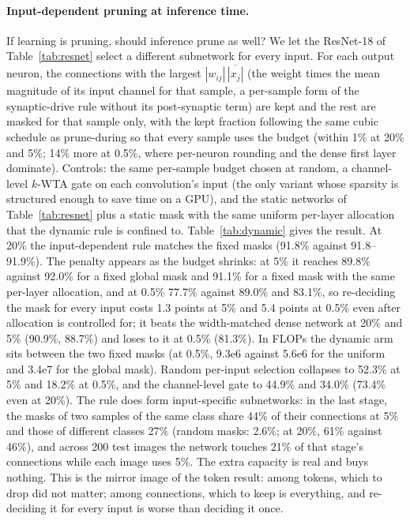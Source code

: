 \documentclass[11pt]{article}
\begin{document}
\paragraph{Input-dependent pruning at inference time.} If learning is pruning, should inference prune as well? We let
the ResNet-18 of Table~\ref{tab:resnet} select a different subnetwork for every input. For each output neuron, the connections
with the largest $|w_{ij}|\,\overline{|x_j|}$ (the weight times the mean magnitude of its input channel for that sample, a
per-sample form of the synaptic-drive rule without its post-synaptic term) are kept and the rest are masked for that sample
only, with the kept fraction following the same cubic schedule as prune-during so that every sample uses the budget (within
1\% at 20\% and 5\%; 14\% more at 0.5\%, where per-neuron rounding and the dense first layer dominate). Controls: the same per-sample
budget chosen at random, a channel-level $k$-WTA gate on each convolution's input (the only variant whose sparsity is structured
enough to save time on a GPU), and the static networks of Table~\ref{tab:resnet} plus a static mask with the same uniform
per-layer allocation that the dynamic rule is confined to. Table~\ref{tab:dynamic} gives the result. At 20\% the input-dependent
rule matches the fixed masks (91.8\% against 91.8--91.9\%). The penalty appears as the budget shrinks: at 5\% it reaches
89.8\% against 92.0\% for a fixed global mask and 91.1\% for a fixed mask with the same per-layer allocation, and at 0.5\%
77.7\% against 89.0\% and 83.1\%, so re-deciding the mask for every input costs 1.3 points at 5\% and 5.4 points at 0.5\%
even after allocation is controlled for; it beats the width-matched dense network at 20\% and 5\% (90.9\%, 88.7\%) and loses
to it at 0.5\% (81.3\%). In FLOPs the dynamic arm sits between the two fixed masks (at 0.5\%, 9.3e6 against 5.6e6 for the
uniform and 3.4e7 for the global mask). Random per-input selection collapses to 52.3\% at 5\% and 18.2\% at 0.5\%, and the channel-level
gate to 44.9\% and 34.0\% (73.4\% even at 20\%). The rule does form input-specific subnetworks: in the last stage, the masks
of two samples of the same class share 44\% of their connections at 5\% and those of different classes 27\% (random masks:
2.6\%; at 20\%, 61\% against 46\%), and across 200 test images the network touches 21\% of that stage's connections while
each image uses 5\%. The extra capacity is real and buys nothing. This is the mirror image of the token result: among tokens, which to drop did not matter; among
connections, which to keep is everything, and re-deciding it for every input is worse than deciding it once.
\end{document}

